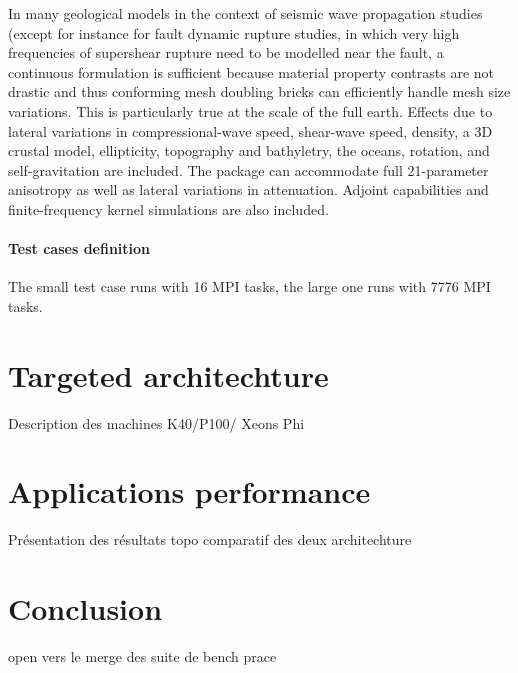 In many geological models in the context of seismic wave propagation studies (except for instance for fault dynamic rupture studies, in which very high frequencies of supershear rupture need to be modelled near the fault, a continuous formulation is sufficient because material property contrasts are not drastic and thus conforming mesh doubling bricks can efficiently handle mesh size variations. This is particularly true at the scale of the full earth. Effects due to lateral variations in compressional-wave speed, shear-wave speed, density, a 3D crustal model, ellipticity, topography and bathyletry, the oceans, rotation, and self-gravitation are included. The package can accommodate full 21-parameter anisotropy as well as lateral variations in attenuation. Adjoint capabilities and finite-frequency kernel simulations are also included.

\subsection{Test cases definition}
The small test case runs with 16 MPI tasks, the large one runs with 7776 MPI tasks.


\part{Targeted architechture}
Description des machines K40/P100/ Xeons Phi

\part{Applications performance}
Présentation des résultats
topo comparatif des deux architechture

\part*{Conclusion}
open vers le merge des suite de bench prace
